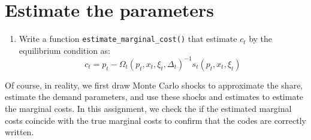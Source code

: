 \documentclass[]{book}
\newenvironment{Shaded}{\begin{snugshade}}{\end{snugshade}}
\newcommand{\KeywordTok}[1]{\textcolor[rgb]{0.13,0.29,0.53}{\textbf{#1}}}
\newcommand{\DataTypeTok}[1]{\textcolor[rgb]{0.13,0.29,0.53}{#1}}
\newcommand{\DecValTok}[1]{\textcolor[rgb]{0.00,0.00,0.81}{#1}}
\newcommand{\FloatTok}[1]{\textcolor[rgb]{0.00,0.00,0.81}{#1}}
\newcommand{\StringTok}[1]{\textcolor[rgb]{0.31,0.60,0.02}{#1}}
\newcommand{\CommentTok}[1]{\textcolor[rgb]{0.56,0.35,0.01}{\textit{#1}}}
\newcommand{\ControlFlowTok}[1]{\textcolor[rgb]{0.13,0.29,0.53}{\textbf{#1}}}
\newcommand{\OperatorTok}[1]{\textcolor[rgb]{0.81,0.36,0.00}{\textbf{#1}}}
\newcommand{\NormalTok}[1]{#1}
\providecommand{\tightlist}{%
  \setlength{\itemsep}{0pt}\setlength{\parskip}{0pt}}
\begin{document}
\begin{Shaded}
\end{Shaded}

\section{Estimate the parameters}\label{estimate-the-parameters-3}

\begin{enumerate}
\def\labelenumi{\arabic{enumi}.}
\tightlist
\item
  Write a function \texttt{estimate\_marginal\_cost()} that estimate
  \(c_t\) by the equilibrium condition as: \[
  c_t = p_t - \Omega_t(p_t, x_t, \xi_t, \Delta_t)^{-1} s_t(p_t, x_t, \xi_t)
  \]
\end{enumerate}

Of course, in reality, we first draw Monte Carlo shocks to approximate
the share, estimate the demand parameters, and use these shocks and
estimates to estimate the marginal costs. In this assignment, we check
the if the estimated marginal costs coincide with the true marginal
costs to confirm that the codes are correctly written.
\end{document}
